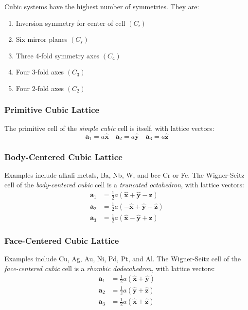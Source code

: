 Cubic systems have the highest number of symmetries. They are:
\begin{enumerate}
    \item Inversion symmetry for center of cell $(C_i)$
    \item Six mirror planes $(C_s)$
    \item Three 4-fold symmetry axes $(C_4)$
    \item Four 3-fold axes $(C_3)$
    \item Four 2-fold axes $(C_2)$
\end{enumerate}
\subsubsection{Primitive Cubic Lattice}
The primitive cell of the \emph{simple cubic} cell is itself, with lattice vectors:
\begin{equation*}
    \mathbf{a}_1 = a \hat{\mathbf{x}} \quad \mathbf{a}_2 = a \hat{\mathbf{y}} \quad \mathbf{a}_3 = a \hat{\mathbf{z}}
\end{equation*}

\subsubsection{Body-Centered Cubic Lattice}
Examples include alkali metals, Ba, Nb, W, and bcc Cr or Fe. The Wigner-Seitz cell of the \emph{body-centered cubic} cell is a \emph{truncated octahedron}, with lattice vectors:
\begin{align*}
    \mathbf{a}_1 & = \frac{1}{2} a (\hat{\mathbf{x}} + \hat{\mathbf{y}} - \hat{\mathbf{z}}) \\
    \mathbf{a}_2 & = \frac{1}{2} a (-\hat{\mathbf{x}} + \hat{\mathbf{y}} + \hat{\mathbf{z}}) \\
    \mathbf{a}_3 & = \frac{1}{2} a (\hat{\mathbf{x}} - \hat{\mathbf{y}} + \hat{\mathbf{z}}) 
\end{align*}

\subsubsection{Face-Centered Cubic Lattice}
Examples include Cu, Ag, Au, Ni, Pd, Pt, and Al. The Wigner-Seitz cell of the \emph{face-centered cubic} cell is a \emph{rhombic dodecahedron}, with lattice vectors:
\begin{align*}
    \mathbf{a}_1 & = \frac{1}{2} a (\hat{\mathbf{x}} + \hat{\mathbf{y}}) \\
    \mathbf{a}_2 & = \frac{1}{2} a (\hat{\mathbf{y}} + \hat{\mathbf{z}}) \\
    \mathbf{a}_3 & = \frac{1}{2} a (\hat{\mathbf{x}} + \hat{\mathbf{z}}) 
\end{align*}



